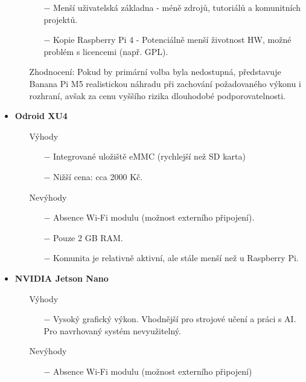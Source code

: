 \begin{itemize}
\begin{itemize}
\begin{itemize}
                \item[$-$] Menší uživatelská základna - méně zdrojů, tutoriálů a komunitních projektů.
                \item[$-$] Kopie Raspberry Pi 4 - Potenciálně menší životnost HW, možné problém s licencemi (např. GPL).
            \end{itemize}
        \item[] Zhodnocení: Pokud by primární volba byla nedostupná, představuje Banana Pi M5 realistickou náhradu při zachování požadovaného výkonu i rozhraní, avšak za cenu vyššího rizika dlouhodobé podporovatelnosti.
        \end{itemize}
    \item \textbf{Odroid XU4}
        \begin{itemize}
        \item[] Výhody
            \begin{itemize}
                \item[$-$] Integrované uložiště eMMC (rychlejší než SD karta)
                \item[$-$] Nižší cena: cca 2000 Kč.
            \end{itemize}
        \item[] Nevýhody
            \begin{itemize}
                \item[$-$] Absence Wi-Fi modulu (možnost externího připojení).
                \item[$-$] Pouze 2 GB RAM.
                \item[$-$] Komunita je relativně aktivní, ale stále menší než u Raspberry Pi.
            \end{itemize}
        \end{itemize}
    \item \textbf{NVIDIA Jetson Nano} 
        \begin{itemize}
            \item[] Výhody
            \begin{itemize}
                \item[$-$] Vysoký grafický výkon. Vhodnější pro strojové učení a práci s AI. Pro navrhovaný systém nevyužitelný.
            \end{itemize}
            \item[] Nevýhody
            \begin{itemize}
                \item[$-$] Absence Wi-Fi modulu (možnost externího připojení)

\end{itemize}
\end{itemize}
\end{itemize}
